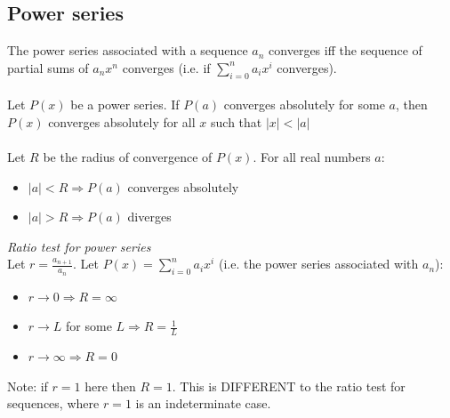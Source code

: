 \documentclass{scrartcl}
\begin{document}
\subsection{Power series}
The power series associated with a sequence $ a_{n} $ converges iff the sequence of partial sums  of $ a_{n}x^{n} $ converges (i.e. if $ \sum_{i = 0}^{n} a_{i}x^{i} $ converges).
\\\\
Let $ P(x) $ be a power series. If $ P(a) $ converges absolutely for some $ a $, then $ P(x) $ converges absolutely for all $ x $ such that $ |x| < |a| $
\\\\
Let $ R $ be the radius of convergence of $ P(x) $. For all real numbers $ a $:
\begin{itemize}
\item $ |a| < R \Rightarrow P(a) $ converges absolutely
\item $ |a| > R \Rightarrow P(a) $ diverges
\end{itemize}
\textit{Ratio test for power series}
\\
Let $ r = \frac{a_{n + 1}}{a_{n}} $. Let $ P(x) = \sum_{i = 0}^{n} a_{i}x^{i} $ (i.e. the power series associated with $ a_{n} $):
\begin{itemize}
\item $ r \to 0 \Rightarrow R = \infty $
\item $ r \to L $ for some $ L \Rightarrow R = \frac{1}{L} $
\item $ r \to \infty \Rightarrow R = 0 $
\end{itemize}
Note: if $ r = 1 $ here then $ R = 1 $. This is DIFFERENT to the ratio test for sequences, where $ r = 1 $ is an indeterminate case.
\end{document}
